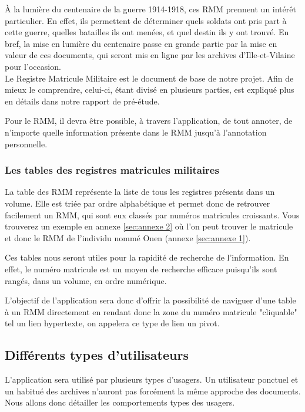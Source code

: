 \documentclass[a4paper]{article}
\begin{document}
\`A la lumière du centenaire de la guerre 1914-1918, ces RMM prennent un intérêt particulier. En effet, ils permettent de déterminer quels soldats ont pris part à cette guerre, quelles batailles ils ont menées, et quel destin ils y ont trouvé. En bref, la mise en lumière du centenaire passe en grande partie par la mise en valeur de ces documents, qui seront mis en ligne par les archives d'Ille-et-Vilaine pour l'occasion.\\

Le Registre Matricule Militaire est le document de base de notre projet. Afin de mieux le comprendre, celui-ci, étant divisé en plusieurs parties, est expliqué plus en détails dans notre rapport de pré-étude.

Pour le RMM, il devra être possible, à travers l'application, de tout annoter, de n'importe quelle information présente dans le RMM jusqu'à l'annotation personnelle. 

\subsubsection{Les tables des registres matricules militaires}
La table des RMM représente la liste de tous les registres présents dans un volume. Elle est triée par ordre alphabétique et permet donc de retrouver facilement un RMM, qui sont eux classés par numéros matricules croissants. Vous trouverez un exemple en annexe \ref{sec:annexe 2} où l'on peut trouver le matricule et donc le RMM de l'individu nommé Onen (annexe \ref{sec:annexe 1}).

Ces tables nous seront utiles pour la rapidité de recherche de l'information. En effet, le numéro matricule est un moyen de recherche efficace puisqu'ils sont rangés, dans un volume, en ordre numérique. 

L'objectif de l'application sera donc d'offrir la possibilité de naviguer d'une table à un RMM directement en rendant donc la zone du numéro matricule "cliquable" tel un lien hypertexte, on appelera ce type de lien un pivot.

\subsection{Différents types d'utilisateurs}

L'application sera utilisé par plusieurs types d'usagers. Un utilisateur ponctuel et un habitué des archives n'auront pas forcément la même approche des documents. Nous allons donc détailler les comportements types des usagers.
\end{document}

